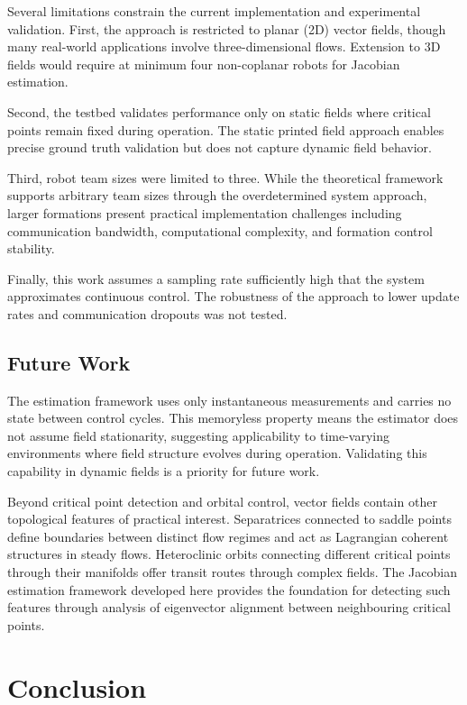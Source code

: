 \documentclass[lettersize,journal]{IEEEtran}
\begin{document}
Several limitations constrain the current implementation and experimental validation. First, the approach is restricted to planar (2D) vector fields, though many real-world applications involve three-dimensional flows. Extension to 3D fields would require at minimum four non-coplanar robots for Jacobian estimation.

Second, the testbed validates performance only on static fields where critical points remain fixed during operation. The static printed field approach enables precise ground truth validation but does not capture dynamic field behavior.

Third, robot team sizes were limited to three. While the theoretical framework supports arbitrary team sizes through the overdetermined system approach, larger formations present practical implementation challenges including communication bandwidth, computational complexity, and formation control stability.

Finally, this work assumes a sampling rate sufficiently high that the system approximates continuous control. The robustness of the approach to lower update rates and communication dropouts was not tested.

\subsection{Future Work}

The estimation framework uses only instantaneous measurements and carries no state between control cycles. This memoryless property means the estimator does not assume field stationarity, suggesting applicability to time-varying environments where field structure evolves during operation. Validating this capability in dynamic fields is a priority for future work.

Beyond critical point detection and orbital control, vector fields contain other topological features of practical interest. Separatrices connected to saddle points define boundaries between distinct flow regimes and act as Lagrangian coherent structures in steady flows. Heteroclinic orbits connecting different critical points through their manifolds offer transit routes through complex fields. The Jacobian estimation framework developed here provides the foundation for detecting such features through analysis of eigenvector alignment between neighbouring critical points.



\section{Conclusion}
\noindent
\end{document}
